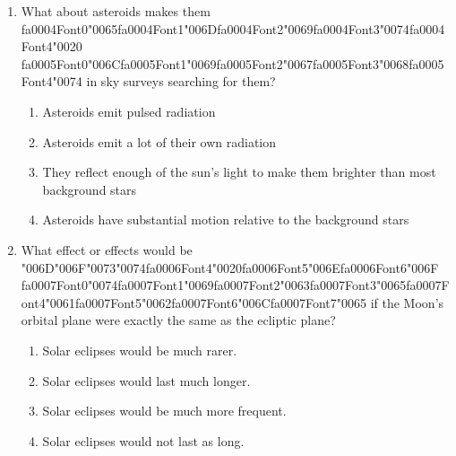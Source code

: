 \documentclass[12pt]{article}
\begin{document}
\begin{enumerate}[label=\arabic*.]
ALH84001?
\begin{enumerate}[label=(\alph*)]
    \item Complex organic molecules specifically PAHs
    \item Magnetite grains similar to those formed by bacteria on Earth
    \item Carbonate minerals indicating a thicker warmer Martian atmosphere
    \item Amino acids with a preferred orientation or "chirality"
\end{enumerate}
\item What about asteroids makes them {\csname fa0004Font0\endcsname\char"0065}{\csname fa0004Font1\endcsname\char"006D}{\csname fa0004Font2\endcsname\char"0069}{\csname fa0004Font3\endcsname\char"0074}{\csname fa0004Font4\endcsname\char"0020} {\csname fa0005Font0\endcsname\char"006C}{\csname fa0005Font1\endcsname\char"0069}{\csname fa0005Font2\endcsname\char"0067}{\csname fa0005Font3\endcsname\char"0068}{\csname fa0005Font4\endcsname\char"0074} in sky surveys searching for them?
\begin{enumerate}[label=(\alph*)]
    \item Asteroids emit pulsed radiation
    \item Asteroids emit a lot of their own radiation
    \item They reflect enough of the sun's light to make them brighter than most background stars
    \item Asteroids have substantial motion relative to the background stars
\end{enumerate}
\item What effect or effects would be {\char"006D}{\char"006F}{\char"0073}{\char"0074}{\csname fa0006Font4\endcsname\char"0020}{\csname fa0006Font5\endcsname\char"006E}{\csname fa0006Font6\endcsname\char"006F} {\csname fa0007Font0\endcsname\char"0074}{\csname fa0007Font1\endcsname\char"0069}{\csname fa0007Font2\endcsname\char"0063}{\csname fa0007Font3\endcsname\char"0065}{\csname fa0007Font4\endcsname\char"0061}{\csname fa0007Font5\endcsname\char"0062}{\csname fa0007Font6\endcsname\char"006C}{\csname fa0007Font7\endcsname\char"0065} if the Moon's orbital plane were exactly
the same as the ecliptic plane?
\begin{enumerate}[label=(\alph*)]
    \item Solar eclipses would be much rarer.
    \item Solar eclipses would last much longer.
    \item Solar eclipses would be much more frequent.
    \item Solar eclipses would not last as long.
\end{enumerate}
\end{enumerate}
\end{document}
